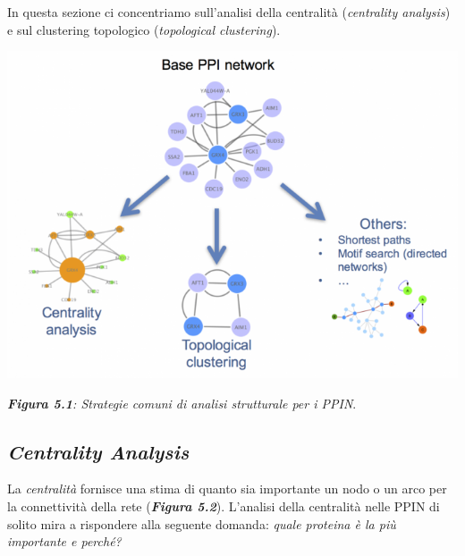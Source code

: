\documentclass[11pt]{article}
\begin{document}
In questa sezione ci concentriamo sull'analisi della centralità (\textit{centrality analysis}) e sul clustering topologico (\textit{topological clustering}).

\begin{center}
\includegraphics[scale=0.43]{ppin}

\begin{small}\textit{\textbf{Figura 5.1}: Strategie comuni di analisi strutturale per i PPIN}.\end{small}
\end{center}

\subsection{\textit{Centrality Analysis}}
La \textit{centralità} fornisce una stima di quanto sia importante un nodo o un arco per la connettività della rete (\textit{\textbf{Figura 5.2}}).
L'analisi della centralità nelle PPIN di solito mira a rispondere alla seguente domanda: \textit{quale proteina è la più importante e perché?}
\end{document}
